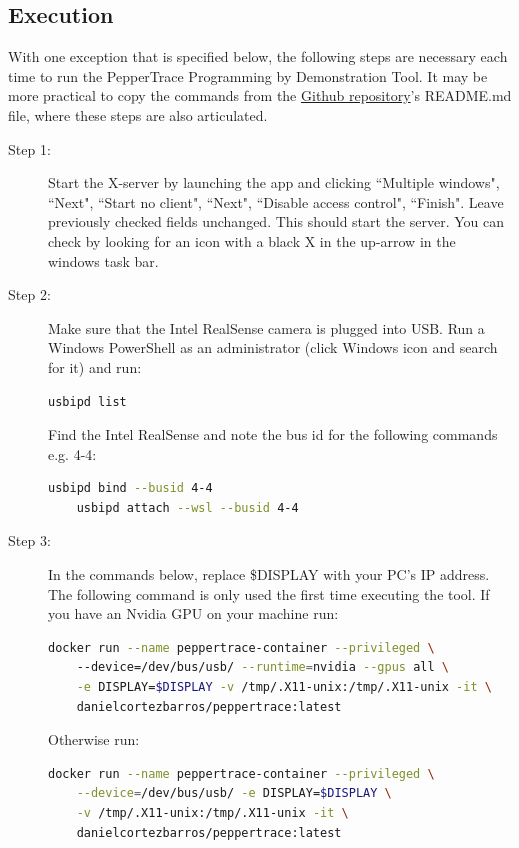 \documentclass{CSSRforAfrica}
\begin{document}
\subsection{Execution}
With one exception that is specified below, the following steps are necessary each time to run the PepperTrace Programming by Demonstration Tool. It may be more practical to copy the commands from the \href{https://github.com/danielcortezbarros/peppertrace}{Github repository}'s README.md file, where these steps are also articulated. 

\begin{description}
    \item[Step 1:] Start the X-server by launching the app and clicking ``Multiple windows", ``Next", ``Start no client", ``Next", ``Disable access control", ``Finish". Leave previously checked fields unchanged. This should start the server. You can check by looking for an icon with a black X in the up-arrow in the windows task bar.
    
    \item[Step 2:] Make sure that the Intel RealSense camera is plugged into USB. Run a Windows PowerShell as an administrator (click Windows icon and search for it) and run:
        \begin{lstlisting}[style=withoutNumbering, language=bash]
    usbipd list
        \end{lstlisting}
    Find the Intel RealSense and note the bus id for the following commands e.g. 4-4:
        \begin{lstlisting}[style=withoutNumbering, language=bash]
    usbipd bind --busid 4-4
    usbipd attach --wsl --busid 4-4
        \end{lstlisting}
    
    
    \item[Step 3:] In the commands below, replace \$DISPLAY with your PC's IP address. The following command is only used the first time executing the tool. If you have an Nvidia GPU on your machine run:
        \begin{lstlisting}[style=withoutNumbering, language=bash]
    docker run --name peppertrace-container --privileged \ 
    --device=/dev/bus/usb/ --runtime=nvidia --gpus all \
    -e DISPLAY=$DISPLAY -v /tmp/.X11-unix:/tmp/.X11-unix -it \
    danielcortezbarros/peppertrace:latest
        \end{lstlisting}
        Otherwise run:
        \begin{lstlisting}[style=withoutNumbering, language=bash]
    docker run --name peppertrace-container --privileged \
    --device=/dev/bus/usb/ -e DISPLAY=$DISPLAY \
    -v /tmp/.X11-unix:/tmp/.X11-unix -it \
    danielcortezbarros/peppertrace:latest
        \end{lstlisting}


\end{description}
\end{document}

